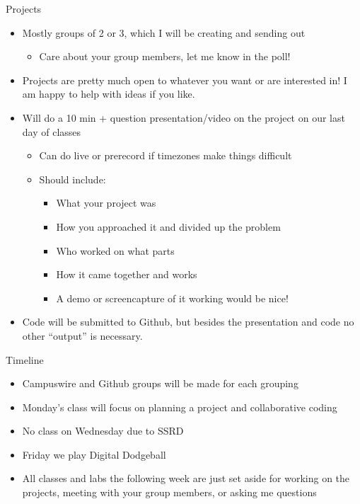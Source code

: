 \documentclass[pdf, aspectratio=169, 12pt]{beamer}
\begin{document}
\begin{frame}{Projects}
	\vspace{5mm}
	\begin{itemize}
		\item Mostly groups of 2 or 3, which I will be creating and sending out
			\begin{itemize}
				\item Care about your group members, let me know in the poll!
			\end{itemize}
		\item Projects are pretty much open to whatever you want or are interested in! I am happy to help with ideas if you like.
		\item Will do a 10 min + question presentation/video on the project on our last day of classes
			\begin{itemize}
				\item Can do live or prerecord if timezones make things difficult
				\item Should include:
					\begin{itemize}
						\item What your project was
						\item How you approached it and divided up the problem
						\item Who worked on what parts
						\item How it came together and works
						\item A demo or screencapture of it working would be nice!
					\end{itemize}
			\end{itemize}
		\item Code will be submitted to Github, but besides the presentation and code no other ``output'' is necessary.
	\end{itemize}
\end{frame}

\begin{frame}{Timeline}
	\begin{itemize}
		\item Campuswire and Github groups will be made for each grouping
		\item Monday's class will focus on planning a project and collaborative coding
		\item No class on Wednesday due to SSRD
		\item Friday we play Digital Dodgeball
		\item All classes and labs the following week are just set aside for working on the projects, meeting with your group members, or asking me questions
	\end{itemize}
\end{frame}
\end{document}
